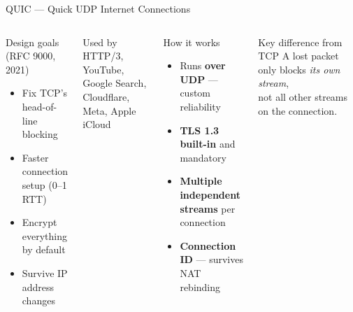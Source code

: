 \documentclass[aspectratio=169]{beamer}
\begin{document}
\begin{frame}{QUIC --- Quick UDP Internet Connections}
  \begin{columns}[T]
      \begin{block}{Design goals (RFC 9000, 2021)}
        \begin{itemize}
          \item Fix TCP's head-of-line blocking
          \item Faster connection setup (0--1 RTT)
          \item Encrypt everything by default
          \item Survive IP address changes
        \end{itemize}
      \end{block}
      \vspace{0.5em}
      \begin{exampleblock}{Used by}
        HTTP/3, YouTube, Google Search,\\
        Cloudflare, Meta, Apple iCloud
      \end{exampleblock}
      \begin{block}{How it works}
        \begin{itemize}
          \item Runs \textbf{over UDP} --- custom reliability
          \item \textbf{TLS 1.3 built-in} and mandatory
          \item \textbf{Multiple independent streams} per connection
          \item \textbf{Connection ID} --- survives NAT rebinding
        \end{itemize}
      \end{block}
      \vspace{0.5em}
      \begin{alertblock}{Key difference from TCP}
        A lost packet only blocks \emph{its own stream},\\
        not all other streams on the connection.
      \end{alertblock}
  \end{columns}
\end{frame}
\end{document}
